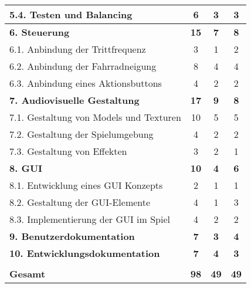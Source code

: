 \begin{tabularx}{\textwidth}{|X|c|c|c|}
5.4. Testen und Balancing & 6 & 3 & 3 \\ \hline
\textbf{6. Steuerung} & \textbf{15} & \textbf{7} & \textbf{8} \\ \hline
6.1. Anbindung der Trittfrequenz & 3 & 1 & 2 \\ \hline
6.2. Anbindung der Fahrradneigung & 8 & 4 & 4 \\ \hline
6.3. Anbindung eines Aktionsbuttons & 4 & 2 & 2 \\ \hline
\textbf{7. Audiovisuelle Gestaltung} & \textbf{17} & \textbf{9} & \textbf{8} \\ \hline
7.1. Gestaltung von Models und Texturen & 10 & 5 & 5 \\ \hline
7.2. Gestaltung der Spielumgebung & 4 & 2 & 2 \\ \hline
7.3. Gestaltung von Effekten & 3 & 2 & 1 \\ \hline
\textbf{8. GUI} & \textbf{10} & \textbf{4} & \textbf{6} \\ \hline
8.1. Entwicklung eines GUI Konzepts & 2 & 1 & 1 \\ \hline
8.2. Gestaltung der GUI-Elemente & 4 & 1 & 3 \\ \hline
8.3. Implementierung der GUI im Spiel & 4 & 2 & 2 \\ \hline
\textbf{9. Benutzerdokumentation} & \textbf{7} & \textbf{3} & \textbf{4} \\ \hline
\textbf{10. Entwicklungsdokumentation} & \textbf{7} & \textbf{4} & \textbf{3} \\ \hline
 &  &  &  \\ \hline
\textbf{Gesamt} & \textbf{98} & \textbf{49} & \textbf{49} \\ \hline
\end{tabularx}
\normalsize